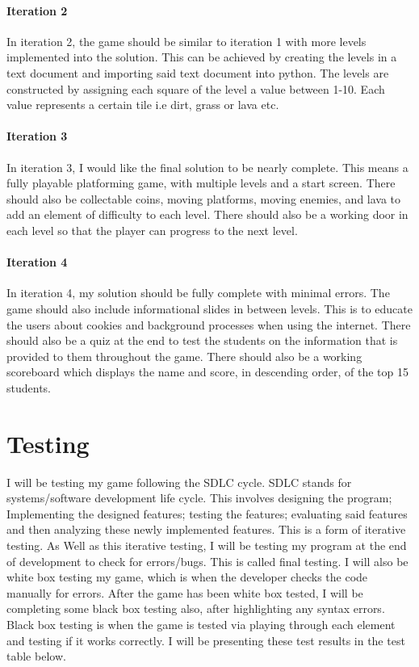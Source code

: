 \documentclass[12pt]{report}
\begin{document}
\paragraph{Iteration 2}
In iteration 2, the game should be similar to iteration 1 with more levels implemented into the solution. This can be achieved by creating the levels in a text document and importing said text document into python. The levels are constructed by assigning each square of the level a value between 1-10. Each value represents a certain tile i.e dirt, grass or lava etc. 

\paragraph{Iteration 3}
In iteration 3, I would like the final solution to be nearly complete. This means a fully playable platforming game, with multiple levels and a start screen. There should also be collectable coins, moving platforms, moving enemies, and lava to add an element of difficulty to each level. There should also be a working door in each level so that the player can progress to the next level.

\paragraph{Iteration 4}
In iteration 4, my solution should be fully complete with minimal errors. The game should also include informational slides in between levels. This is to educate the users about cookies and background processes when using the internet. There should also be a quiz at the end to test the students on the information that is provided to them throughout the game. There should also be a working scoreboard which displays the name and score, in descending order, of the top 15 students. 


\section{Testing}
I will be testing my game following the SDLC cycle. SDLC stands for systems/software development life cycle. This involves designing the program; Implementing the designed features; testing the features; evaluating said features and then analyzing these newly implemented features. This is a form of iterative testing. As Well as this iterative testing, I will be testing my program at the end of development to check for errors/bugs. This is called final testing. I will also be white box testing my game, which is when the developer checks the code manually for errors. After the game has been white box tested, I will be completing some black box testing also, after highlighting any syntax errors. Black box testing is when the game is tested via playing through each element and testing if it works correctly. I will be presenting these test results in the test table below. 
\end{document}
